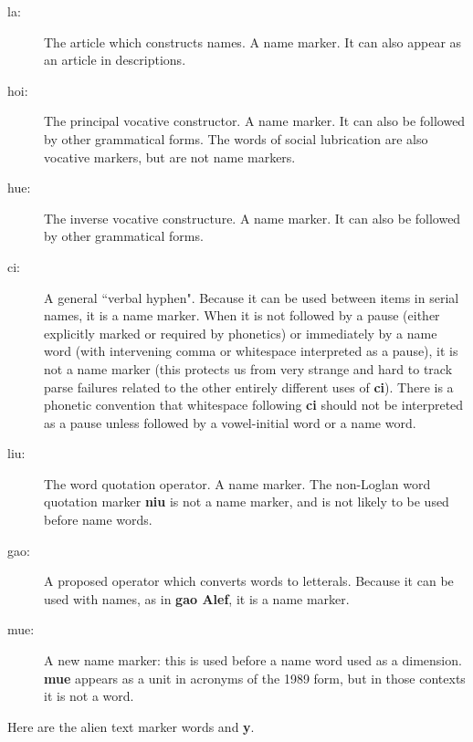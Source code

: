 \documentclass[12pt]{book}
\begin{document}
\begin{description}

\item[la:]  The article which constructs names.  A name marker.  It can also appear as an article in descriptions.

\item[hoi:]  The principal vocative constructor.  A name marker.  It can also be followed by other grammatical forms.  The words of social lubrication are also vocative markers, but are not name markers.

\item[hue:]  The inverse vocative constructure.  A name marker.  It can also be followed by other grammatical forms.

\item[ci:]  A general ``verbal hyphen".  Because it can be used between items in serial names, it is a name marker.   When it is not followed by a pause (either explicitly marked or required by phonetics) or immediately by a name word (with intervening comma or whitespace interpreted as a pause), it is not a name marker (this protects us from very strange and hard to track parse failures related to the other entirely different uses of {\bf ci}).  There is a phonetic convention that whitespace following {\bf ci} should not be interpreted as a pause unless followed by a vowel-initial word or a name word.

\item[liu:]  The word quotation operator.  A name marker.  The non-Loglan word quotation marker {\bf niu} is not a name marker, and is not likely to be used before name words.

\item[gao:]  A proposed operator which converts words to letterals.  Because it can be used with names, as in {\bf gao Alef}, it is a name marker.

\item[mue:]  A new name marker:  this is used before a name word used as a dimension.  {\bf mue} appears as a unit in acronyms of the 1989 form, but in those contexts it is not a word.

\end{description}

Here are the alien text marker words and {\bf y}.
\end{document}
